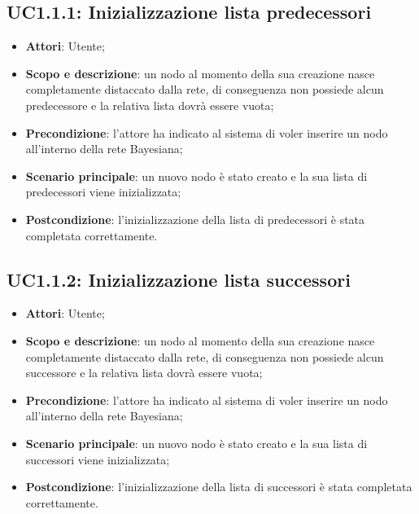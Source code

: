 \subsection{UC1.1.1: Inizializzazione lista predecessori} 
\hypertarget{UC1.1.1}{} 
\begin{itemize} 
	\item{\textbf{Attori}: Utente;} 
	\item{\textbf{Scopo e descrizione}: un nodo al momento della sua creazione nasce completamente distaccato dalla rete, di conseguenza non possiede alcun predecessore e la relativa lista dovrà essere vuota;} 
	\item{\textbf{Precondizione}: l'attore ha indicato al sistema di voler inserire un nodo all'interno della rete Bayesiana;}
	\item{\textbf{Scenario principale}: un nuovo nodo è stato creato e la sua lista di predecessori viene inizializzata;} 
	\item{\textbf{Postcondizione}: l'inizializzazione della lista di predecessori è stata completata correttamente.} 
\end{itemize} 
\subsection{UC1.1.2: Inizializzazione lista successori} 
\hypertarget{UC1.1.2}{} 
\begin{itemize} 
	\item{\textbf{Attori}: Utente;} 
	\item{\textbf{Scopo e descrizione}: un nodo al momento della sua creazione nasce completamente distaccato dalla rete, di conseguenza non possiede alcun successore e la relativa lista dovrà essere vuota;} 
	\item{\textbf{Precondizione}: l'attore ha indicato al sistema di voler inserire un nodo all'interno della rete Bayesiana;} 
	\item{\textbf{Scenario principale}: un nuovo nodo è stato creato e la sua lista di successori viene inizializzata;} 
	\item{\textbf{Postcondizione}: l'inizializzazione della lista di successori è stata completata correttamente.} 
\end{itemize} 
